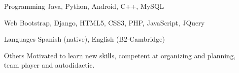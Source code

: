 

\begin{cvskills}

  \cvskill
    {Programming} %
    {Java, Python, Android, C++, MySQL} %

  \cvskill
    {Web} %
    {Bootstrap, Django, HTML5, CSS3, PHP, JavaScript, JQuery} %

  \cvskill
    {Languages} %
    {Spanish (native), English (B2-Cambridge)} %

  \cvskill
    {Others} %
    {Motivated to learn new skills, competent at organizing and planning, team player and autodidactic.} %

\end{cvskills}
